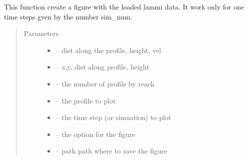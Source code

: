 \documentclass[letterpaper,10pt,english]{sphinxmanual}
\begin{document}
\begin{fulllineitems}
\label{\detokenize{index:src.lammi.fig_lammi}}
This function create a figure with the loaded lammi data.
It work only for one time steps gven by the number sim\_num.
\begin{quote}\begin{description}
\item[{Parameters}] \leavevmode\begin{itemize}
\item {} 
 -- dist along the profile, height, vel

\item {} 
 -- x,y, dist along profile, height

\item {} 
 -- the number of profile by reach

\item {} 
 -- the profile to plot

\item {} 
 -- the time step (or simuation) to plot

\item {} 
 -- the option for the figure

\item {} 
 -- path path where to save the figure

\end{itemize}

\end{description}\end{quote}

\end{fulllineitems}

\end{document}
